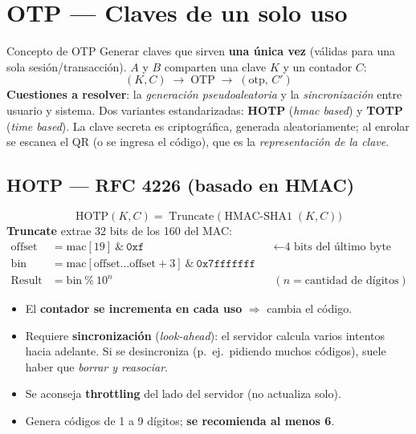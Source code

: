 \documentclass[11pt,a4paper]{article}
\DeclareMathOperator{\Trunc}{Truncate}
\DeclareMathOperator{\HMACSHA}{HMAC\text{-}SHA1}
\begin{document}
\section{OTP — Claves de un solo uso}

\begin{defbox}{Concepto de OTP}
Generar claves que sirven \textbf{una única vez} (válidas para una sola sesión/transacción).
$A$ y $B$ comparten una clave $K$ y un contador $C$:
\[
  (K, C) \;\longrightarrow\; \text{OTP} \;\longrightarrow\; (\text{otp},\, C')
\]
\textbf{Cuestiones a resolver}: la \emph{generación pseudoaleatoria} y la
\emph{sincronización} entre usuario y sistema. Dos variantes estandarizadas:
\textbf{HOTP} (\emph{hmac based}) y \textbf{TOTP} (\emph{time based}).
La clave secreta es criptográfica, generada aleatoriamente; al enrolar se escanea el QR (o
se ingresa el código), que es la \emph{representación de la clave}.
\end{defbox}

\subsection{HOTP — RFC 4226 (basado en HMAC)}
\[
  \mathrm{HOTP}(K, C) = \Trunc\bigl(\HMACSHA(K, C)\bigr)
\]
\textbf{Truncate} extrae 32 bits de los 160 del MAC:
\[
\begin{aligned}
  \text{offset} &= \mathrm{mac}[19]\ \&\ \texttt{0xf} &&\leftarrow \text{4 bits del último byte}\\
  \text{bin} &= \mathrm{mac}[\text{offset}\dots\text{offset}{+}3]\ \&\ \texttt{0x7fffffff}\\
  \text{Result} &= \text{bin}\ \%\ 10^{n} &&(n = \text{cantidad de dígitos})
\end{aligned}
\]
\begin{itemize}[leftmargin=1.4em,itemsep=1pt]
  \item El \textbf{contador se incrementa en cada uso} $\Rightarrow$ cambia el código.
  \item Requiere \textbf{sincronización} (\emph{look-ahead}): el servidor calcula varios
        intentos hacia adelante. Si se desincroniza (p.\ ej.\ pidiendo muchos códigos), suele
        haber que \emph{borrar y reasociar}.
  \item Se aconseja \textbf{throttling} del lado del servidor (no actualiza solo).
  \item Genera códigos de 1 a 9 dígitos; \textbf{se recomienda al menos 6}.
\end{itemize}
\end{document}
